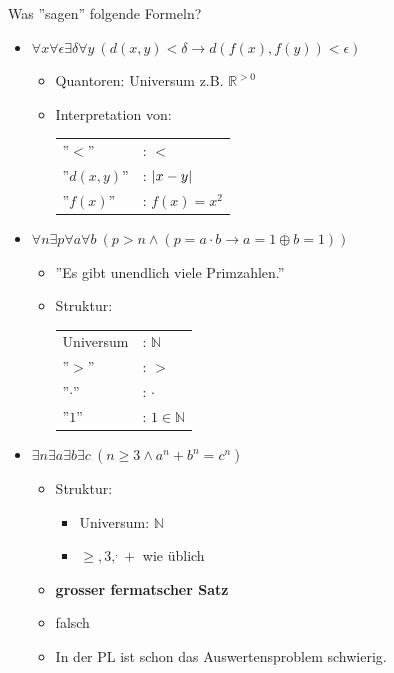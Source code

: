 \begin{bsp}
	Was ''sagen'' folgende Formeln?\\
	\begin{itemize}
		\item $\forall x \forall \epsilon \exists \delta \forall y~( d( x, y )  < \delta \rightarrow d( f( x ) , f( y ) ) < \epsilon )$
		\begin{itemize}
			\item Quantoren: Universum z.B. $\mathbb{R}^{>0}$
			\item Interpretation von: \\
			\begin{tabular}{ l l }
				''$<$''		& : $<$			\\
				''$d( x , y )$''	& : $\abs{x-y}$		\\
				''$f( x )$''		& : $f( x ) = x^2$	
			\end{tabular}
		\end{itemize}
		\item $\forall n \exists p \forall a \forall b~(p > n \wedge ( p = a \cdot b \rightarrow a = 1 \oplus b = 1 ) )$
		\begin{itemize}
			\item ''Es gibt unendlich viele Primzahlen.''
			\item Struktur: \\
			\begin{tabular}{ l l }
				Universum	& : $\mathbb{N}$		\\
				''$>$''	& : $>$				\\
				''$\cdot$''	& : $\cdot$			\\
				''$1$''	& : $1 \in \mathbb{N}$	
			\end{tabular}
		\end{itemize}
		\item $\exists n \exists a \exists b \exists c~( n \geq 3 \wedge a^n + b^n = c^n )$
		\begin{itemize}
			\item Struktur:
			\begin{itemize}
				\item Universum: $\mathbb{N}$
				\item $\geq , 3 , ^ , +$ wie üblich
			\end{itemize}
			\item \textbf{grosser fermatscher Satz}
			\item falsch
			\item In der PL ist schon das Auswertensproblem schwierig.
		\end{itemize}
	\end{itemize}
\end{bsp}
